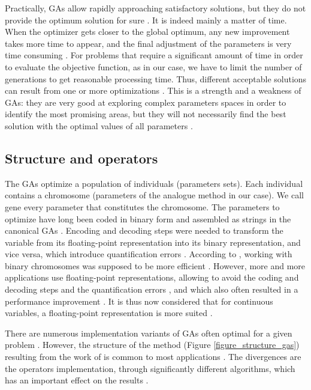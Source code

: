 \documentclass[twocol]{ametsoc}
\begin{document}
Practically, GAs allow rapidly approaching satisfactory solutions, but they do not provide the optimum solution for sure \citep{Zitzler2004a}. It is indeed mainly a matter of time. When the optimizer gets closer to the global optimum, any new improvement takes more time to appear, and the final adjustment of the parameters is very time consuming \citep{Back1993a}. For problems that require a significant amount of time in order to evaluate the objective function, as in our case, we have to limit the number of generations to get reasonable processing time. Thus, different acceptable solutions can result from one or more optimizations \citep{Holland1992b}. This is a strength and a weakness of GAs: they are very good at exploring complex parameters spaces in order to identify the most promising areas, but they will not necessarily find the best solution with the optimal values of all parameters \citep{Holland1992b}.


\subsection{Structure and operators}

The GAs optimize a population of individuals (parameters sets). Each individual contains a chromosome (parameters of the analogue method in our case). We call gene every parameter that constitutes the chromosome. The parameters to optimize have long been coded in binary form and assembled as strings in the canonical GAs \citep{Goldberg1989}. Encoding and decoding steps were needed to transform the variable from its floating-point representation into its binary representation, and vice versa, which introduce quantification errors \citep{Haupt2004}. According to \citet{Holland1992b}, working with binary chromosomes was supposed to be more efficient \citep{Goldberg1990a, Back1993b}. However, more and more applications use floating-point representations, allowing to avoid the coding and decoding steps and the quantification errors \citep{Haupt2004}, and which also often resulted in a performance improvement \citep{Goldberg1990a}. It is thus now considered that for continuous variables, a floating-point representation is more suited \citep{Michalewicz1996, Herrera1998a, Haupt2004, Back1996b, Gaffney2010a}. 

There are numerous implementation variants of GAs often optimal for a given problem \citep{Hart1991a,Schraudolph1992a}. However, the structure of the method (Figure \ref{figure_structure_gas}) resulting from the work of \citet{Holland1992b} is common to most applications \citep{Back1993b}. The divergences are the operators implementation, through significantly different algorithms, which has an important effect on the results \citep{Gaffney2010a}.
\end{document}
